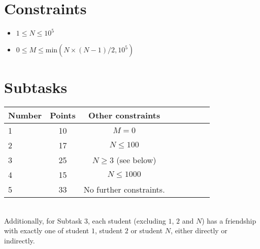 \documentclass{article}
\begin{document}
\section*{Constraints}
\begin{itemize}
\item $1 \le N \le 10^5$
\item $0 \le M \le \mathrm{min}(N \times (N - 1)/2, 10^5)$
\end{itemize}

\section*{Subtasks}
\begin{tabular}{l*{6}{c}r}
Number & Points & Other constraints\\
\hline
1 & 10 & $M = 0$ \\
2 & 17 & $N \le 100$ \\
3 & 25 & $N \ge 3$ (see below) \\
4 & 15 & $N \le 1000$ \\
5 & 33 & No further constraints.
\end{tabular} \\

Additionally, for Subtask 3, each student (excluding $1$, $2$ and $N$) has a friendship with exactly one of student $1$, student $2$ or student $N$, either directly or indirectly.
\end{document}
